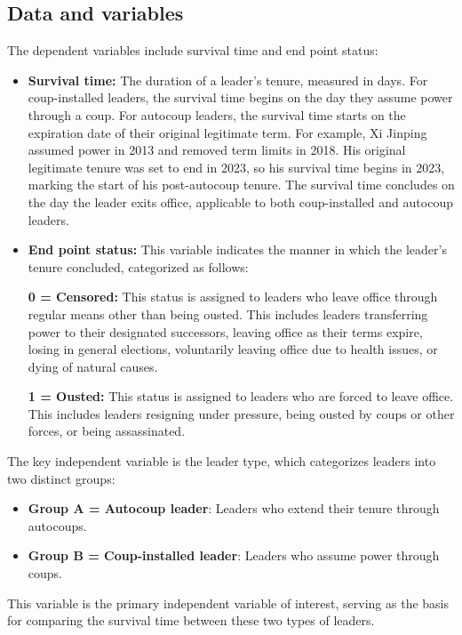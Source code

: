 \documentclass[
  12pt,
]{report}
\providecommand{\tightlist}{%
  \setlength{\itemsep}{0pt}\setlength{\parskip}{0pt}}\usepackage{longtable,booktabs,array}
\begin{document}
\subsection{Data and variables}\label{data-and-variables}

The dependent variables include survival time and end point status:

\begin{itemize}
\item
  \textbf{Survival time:} The duration of a leader's tenure, measured in
  days. For coup-installed leaders, the survival time begins on the day
  they assume power through a coup. For autocoup leaders, the survival
  time starts on the expiration date of their original legitimate term.
  For example, Xi Jinping assumed power in 2013 and removed term limits
  in 2018. His original legitimate tenure was set to end in 2023, so his
  survival time begins in 2023, marking the start of his post-autocoup
  tenure. The survival time concludes on the day the leader exits
  office, applicable to both coup-installed and autocoup leaders.
\item
  \textbf{End point status:} This variable indicates the manner in which
  the leader's tenure concluded, categorized as follows:

  \textbf{0 = Censored:} This status is assigned to leaders who leave
  office through regular means other than being ousted. This includes
  leaders transferring power to their designated successors, leaving
  office as their terms expire, losing in general elections, voluntarily
  leaving office due to health issues, or dying of natural causes.

  \textbf{1 = Ousted:} This status is assigned to leaders who are forced
  to leave office. This includes leaders resigning under pressure, being
  ousted by coups or other forces, or being assassinated.
\end{itemize}

The key independent variable is the leader type, which categorizes
leaders into two distinct groups:

\begin{itemize}
\tightlist
\item
  \textbf{Group A = Autocoup leader}: Leaders who extend their tenure
  through autocoups.
\item
  \textbf{Group B = Coup-installed leader}: Leaders who assume power
  through coups.
\end{itemize}

This variable is the primary independent variable of interest, serving
as the basis for comparing the survival time between these two types of
leaders.
\end{document}

